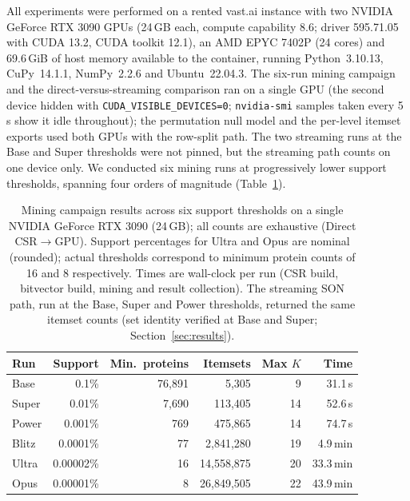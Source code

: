\documentclass[10pt,a4paper,twocolumn]{article}
\begin{document}
All experiments were performed on a rented vast.ai instance with two NVIDIA GeForce RTX 3090 GPUs (24\,GB each, compute capability 8.6; driver 595.71.05 with CUDA 13.2, CUDA toolkit 12.1), an AMD EPYC 7402P (24 cores) and 69.6\,GiB of host memory available to the container, running Python~3.10.13, CuPy~14.1.1, NumPy~2.2.6 and Ubuntu~22.04.3. The six-run mining campaign and the direct-versus-streaming comparison ran on a single GPU (the second device hidden with \texttt{CUDA\_VISIBLE\_DEVICES=0}; \texttt{nvidia-smi} samples taken every 5\,s show it idle throughout); the permutation null model and the per-level itemset exports used both GPUs with the row-split path. The two streaming runs at the Base and Super thresholds were not pinned, but the streaming path counts on one device only. We conducted six mining runs at progressively lower support thresholds, spanning four orders of magnitude (Table~\ref{tab:campaign}).

\begin{table}[t]
\caption{Mining campaign results across six support thresholds on a single NVIDIA GeForce RTX 3090 (24\,GB); all counts are exhaustive (Direct CSR$\to$GPU). Support percentages for Ultra and Opus are nominal (rounded); actual thresholds correspond to minimum protein counts of 16 and 8 respectively. Times are wall-clock per run (CSR build, bitvector build, mining and result collection). The streaming SON path, run at the Base, Super and Power thresholds, returned the same itemset counts (set identity verified at Base and Super; Section~\ref{sec:results}).}
\label{tab:campaign}
\centering
\small
\begin{tabular}{lrrrrr}
\toprule
Run & Support & Min.\ proteins & Itemsets & Max $K$ & Time \\
\midrule
Base & 0.1\% & 76,891 & 5,305 & 9 & 31.1\,s \\
Super & 0.01\% & 7,690 & 113,405 & 14 & 52.6\,s \\
Power & 0.001\% & 769 & 475,865 & 14 & 74.7\,s \\
Blitz & 0.0001\% & 77 & 2,841,280 & 19 & 4.9\,min \\
Ultra & 0.00002\% & 16 & 14,558,875 & 20 & 33.3\,min \\
Opus & 0.00001\% & 8 & 26,849,505 & 22 & 43.9\,min \\
\bottomrule
\end{tabular}
\end{table}
\end{document}
